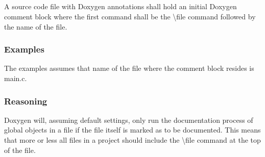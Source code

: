 \subsection*{\doxygenRule{}}

A source code file with Doxygen annotations shall hold an initial Doxygen comment block where the first command shall be the \textbackslash file command followed by the name of the file.

\subsubsection*{Examples}

The examples assumes that name of the file where the comment block resides is main.c.

\noindent
\begin{minipage}[t]{\codelstwidth\textwidth}
    
\end{minipage}\hfill
\begin{minipage}[t]{\codelstwidth\textwidth}
    
\end{minipage}

\subsubsection*{Reasoning}

Doxygen will, assuming default settings, only run the documentation process of global objects in a file if the file itself is marked as to be documented. This means that more or less all files in a project should include the \textbackslash file command at the top of the file.
